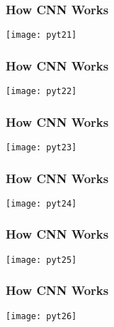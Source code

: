 \begin{frame}[fragile] \frametitle{How CNN Works}
\begin{center}
\texttt{[image: pyt21]}
\end{center}

\end{frame}

\begin{frame}[fragile] \frametitle{How CNN Works}
\begin{center}
\texttt{[image: pyt22]}
\end{center}

\end{frame}

\begin{frame}[fragile] \frametitle{How CNN Works}
\begin{center}
\texttt{[image: pyt23]}
\end{center}

\end{frame}

\begin{frame}[fragile] \frametitle{How CNN Works}
\begin{center}
\texttt{[image: pyt24]}
\end{center}

\end{frame}

\begin{frame}[fragile] \frametitle{How CNN Works}
\begin{center}
\texttt{[image: pyt25]}
\end{center}

\end{frame}

\begin{frame}[fragile] \frametitle{How CNN Works}
\begin{center}
\texttt{[image: pyt26]}
\end{center}

\end{frame}

